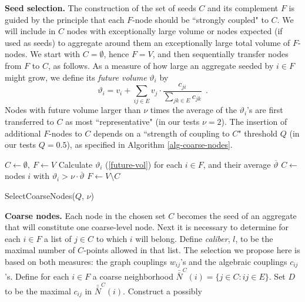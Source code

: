 \documentclass[final]{siamltex}
\begin{document}
\par {\bf Seed selection.} The construction of the set of seeds $C$ and its complement
$F$ is guided by the principle that each $F$-node should be
``strongly coupled" to $C$. We will include in $C$ nodes with
exceptionally large volume or nodes expected (if used as seeds)
to aggregate around them an exceptionally large total volume of $F$-nodes.
We start with $C = \emptyset$, hence $F=V$, and then sequentially
transfer nodes from $F$ to $C$, as follows. As a measure of how
large an aggregate seeded by $i \in F$ might grow, we define its
{\it future volume} $\vartheta_i$
by
\begin{equation}\label{future-vol}
\vartheta_i = v_i + \sum_{ij\in E}v_j\cdot
\frac{c_{ji}}{\sum_{jk\in E}c_{jk}}~~.
\end{equation}
Nodes with future volume larger than $\nu$ times the
average of the $\vartheta_i$'s are first transferred to $C$ as
most ``representative" (in our tests $\nu=2$). The insertion of
additional $F$-nodes to $C$ depends on a ``strength of coupling to $C$" threshold $Q$ (in our
tests $Q=0.5$),
as specified in Algorithm
\ref{alg-coarse-nodes}.
\begin{algorithm}
\SetLine
{}

$C\leftarrow \emptyset,~F\leftarrow V$\; Calculate $\vartheta_i$
(\ref{future-vol}) for each $i\in F$, and their average
$\overline{\vartheta}$\; $C\leftarrow$nodes $i$ with $\vartheta_i
> \nu \cdot \overline{\vartheta}$\; $F\leftarrow V\setminus C$\;
\SetLine {} {
\SetNoline {}\; }
\caption{SelectCoarseNodes($Q$, $\nu$)}\label{alg-coarse-nodes}
\end{algorithm}
\par {\bf Coarse nodes.} Each node in the chosen set $C$ becomes
the seed of an aggregate that will constitute one coarse-level
node. Next it is necessary to determine for each $i \in F$ a list
of $j \in C$ to which $i$ will belong. Define {\it caliber}, $l$,
to be the maximal number of $C$-points allowed in that list. The
selection we propose here is based on both measures: the graph
couplings $w_{ij}$'s and the algebraic couplings $c_{ij}$'s.
Define for each $i \in F$ a coarse neighborhood
$\bar{\bar{N}}^C(i)=\{ j \in C : ij \in E \}$. Set $D$ to be the
maximal $c_{ij}$ in $\bar{\bar{N}}^C(i)$. Construct a possibly
\end{document}
